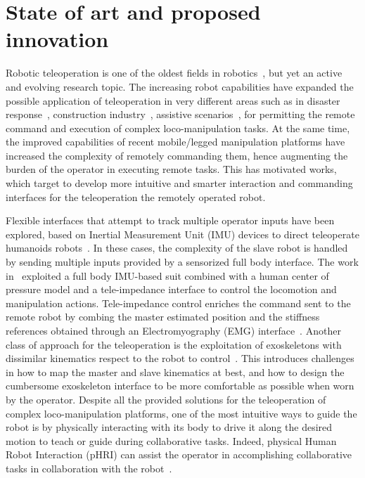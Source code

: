 \newpage
\section{State of art and proposed innovation} 

Robotic teleoperation is one of the oldest fields in robotics~\cite{Goertz1952},⁠ but yet an active and evolving research topic. The increasing robot capabilities have expanded the possible application of teleoperation in very different areas such as in disaster response~\cite{Liu2013}⁠⁠, construction industry~\cite{Carra2018}, assistive scenarios~\cite{Petrich2022}, for permitting the remote command and execution of complex loco-manipulation tasks. At the same time, the improved capabilities of recent mobile/legged manipulation platforms have increased the complexity of remotely commanding them, hence augmenting the burden of the operator in executing remote tasks. This has motivated works, which target to develop more intuitive and smarter interaction and commanding interfaces for the teleoperation the remotely operated robot.

Flexible interfaces that attempt to track multiple operator inputs have been explored, based on Inertial Measurement Unit (IMU) devices to direct teleoperate humanoids robots~\cite{Darvish23}. In these cases, the complexity of the slave robot is handled by sending multiple inputs provided by a sensorized full body interface. The work in~\cite{Wu2019}⁠ exploited a full body IMU-based suit combined with a human center of pressure model and a tele-impedance interface to control the locomotion and manipulation actions. Tele-impedance control enriches the command sent to the remote robot by combing the master estimated position and the stiffness references obtained through an Electromyography (EMG) interface~\cite{Ajoudani2012}⁠. Another class of approach for the teleoperation is the exploitation of exoskeletons with dissimilar kinematics respect to the robot to control~\cite{Rebelo2012}⁠. This introduces challenges in how to map the master and slave kinematics at best, and how to design the cumbersome exoskeleton interface to be more comfortable as possible when worn by the operator. Despite all the provided solutions for the teleoperation of complex loco-manipulation platforms, one of the most intuitive ways to guide the robot is by physically interacting with its body to drive it along the desired motion to teach or guide during collaborative tasks. Indeed, physical Human Robot Interaction (pHRI) can assist the operator in accomplishing collaborative tasks in collaboration with the robot~\cite{Cherubini2016, Kruger2009}⁠. 

